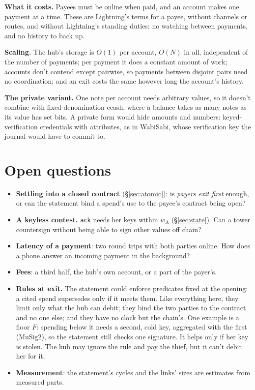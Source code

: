 \documentclass[11pt]{article}
\theoremstyle{plain}
\theoremstyle{definition}
\newcommand{\tx}[1]{\texttt{#1}}
\begin{document}
\textbf{What it costs.} Payees must be online when paid, and an account
makes one payment at a time. These are Lightning's terms for a payee,
without channels or routes, and without Lightning's standing duties:
no watching between payments, and no history to back up.

\textbf{Scaling.} The hub's storage is $O(1)$ per account, $O(N)$ in
all, independent of the number of payments; per payment it does a
constant amount of work; accounts don't contend except pairwise, so
payments between disjoint pairs need no coordination; and an exit costs
the same however long the account's history.

\textbf{The private variant.} One note per account needs arbitrary
values, so it doesn't combine with fixed-denomination ecash, where a
balance takes as many notes as its value has set bits. A private form
would hide amounts and numbers: keyed-verification credentials with
attributes, as in WabiSabi, whose verification key the journal would
have to commit to.

\section{Open questions}\label{sec:open}

\begin{itemize}[nosep]
\item \textbf{Settling into a closed contract} (\S\ref{sec:atomic}): is
  \emph{payers exit first} enough, or can the statement bind a spend's
  use to the payee's contract being open?
\item \textbf{A keyless contest.} \tx{ack} needs her keys within $w_A$
  (\S\ref{sec:state}). Can a tower countersign without being able to
  sign other values off chain?
\item \textbf{Latency of a payment}: two round trips with both parties
  online. How does a phone answer an incoming payment in the background?
\item \textbf{Fees}: a third half, the hub's own account, or a part of
  the payer's.
\item \textbf{Rules at exit.} The statement could enforce predicates
  fixed at the opening: a cited spend supersedes only if it meets them.
  Like everything here, they limit only what the hub can debit; they
  bind the two parties to the contract and no one else; and they have
  no clock but the chain's. One example is a floor $F$: spending below
  it needs a second, cold key, aggregated with the first (MuSig2), so
  the statement still checks one signature. It helps only if her key is
  stolen. The hub may ignore the rule and pay the thief, but it can't
  debit her for it.
\item \textbf{Measurement}: the statement's cycles and the links' sizes
  are estimates from measured parts.
\end{itemize}
\end{document}
